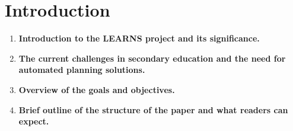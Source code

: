 \section{Introduction}
\begin{enumerate}
    \item \textbf{Introduction to the LEARNS project and its significance.}
    \item \textbf{The current challenges in secondary education and the need for automated planning solutions.}
    \item \textbf{Overview of the goals and objectives.}
    \item \textbf{Brief outline of the structure of the paper and what readers can expect.}
\end{enumerate}